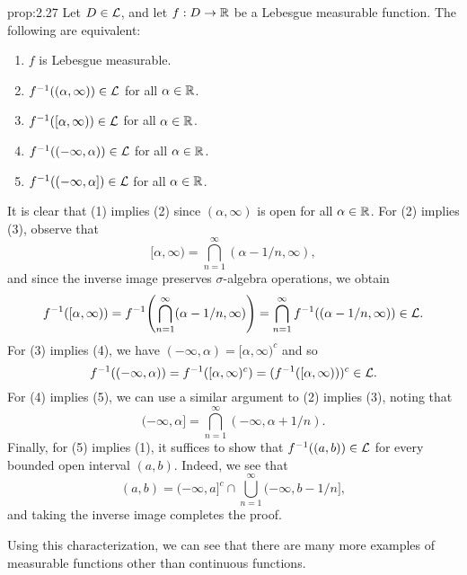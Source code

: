\begin{prop}{prop:2.27}
    Let $D \in {\cal L}$, and let $f : D \to \mathbb{R}$ be a Lebesgue measurable 
    function. The following are equivalent: 
    \begin{enumerate}[(1)]
        \item $f$ is Lebesgue measurable. 
        \item $f^{-1}((\alpha, \infty)) \in {\cal L}$ for all $\alpha \in \mathbb{R}$. 
        \item $f^{-1}([\alpha, \infty)) \in {\cal L}$ for all $\alpha \in \mathbb{R}$. 
        \item $f^{-1}((-\infty, \alpha)) \in {\cal L}$ for all $\alpha \in \mathbb{R}$. 
        \item $f^{-1}((-\infty, \alpha]) \in {\cal L}$ for all $\alpha \in \mathbb{R}$. 
    \end{enumerate}
\end{prop}
\begin{pf}
    It is clear that (1) implies (2) since $(\alpha, \infty)$ is open
    for all $\alpha \in \mathbb{R}$. For (2) implies (3), observe that 
    \[ [\alpha, \infty) = \bigcap_{n=1}^\infty (\alpha - 1/n, \infty), \] 
    and since the inverse image preserves $\sigma$-algebra operations, 
    we obtain 
    \[ f^{-1}([\alpha, \infty)) = f^{-1}\!\left( \bigcap_{n=1}^\infty 
    (\alpha - 1/n, \infty) \right) = \bigcap_{n=1}^\infty 
    f^{-1}((\alpha - 1/n, \infty)) \in {\cal L}. \] 
    For (3) implies (4), we have $(-\infty, \alpha) = [\alpha, \infty)^c$ 
    and so 
    \[ f^{-1}((-\infty, \alpha)) = f^{-1}([\alpha, \infty)^c) 
    = (f^{-1}([\alpha, \infty)))^c \in {\cal L}. \] 
    For (4) implies (5), we can use a similar argument to (2) implies (3), 
    noting that 
    \[ (-\infty, \alpha] = \bigcap_{n=1}^\infty (-\infty, \alpha + 1/n). \] 
    Finally, for (5) implies (1), it suffices to show that $f^{-1}((a, b)) 
    \in {\cal L}$ for every bounded open interval $(a, b)$. Indeed, we 
    see that 
    \[ (a, b) = (-\infty, a]^c \cap \bigcup_{n=1}^\infty (-\infty, 
    b - 1/n], \] 
    and taking the inverse image completes the proof. 
\end{pf}

Using this characterization, we can see that there are many more examples 
of measurable functions other than continuous functions. 


